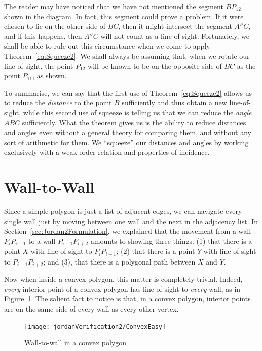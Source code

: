 The reader may have noticed that we have not mentioned the segment $BP_{12}$ shown in the diagram. In fact, this segment could prove a problem. If it were chosen to lie on the other side of $BC$, then it might intersect the segment $A''C$, and if this happens, then $A''C$ will not count as a line-of-sight. Fortunately, we shall be able to rule out this circumstance when we come to apply Theorem~\ref{eq:Squeeze2}. We shall always be assuming that, when we rotate our line-of-sight, the point $P_{12}$ will be known to be on the opposite side of $BC$ as the point $P_{11}$, as shown.

To summarise, we can say that the first use of Theorem~\ref{eq:Squeeze2} allows us to reduce the \emph{distance} to the point $B$ sufficiently and thus obtain a new line-of-sight, while this second use of squeeze is telling us that we can reduce the \emph{angle} $ABC$ sufficiently. What the theorem gives us is the ability to reduce distances and angles even without a general theory for comparing them, and without any sort of arithmetic for them. We ``squeeze'' our distances and angles by working exclusively with a weak order relation and properties of incidence.

\section{Wall-to-Wall}\label{sec:NavigationVerification}
Since a simple polygon is just a list of adjacent edges, we can navigate every single wall just by moving between one wall and the next in the adjacency list. In Section~\ref{sec:Jordan2Formulation}, we explained that the movement from a wall $P_{i}P_{i+1}$ to a wall $P_{i+1}P_{i+2}$ amounts to showing three things: (1) that there is a point $X$ with line-of-sight to $P_{i}P_{i+1}$; (2) that there is a point $Y$ with line-of-sight to $P_{i+1}P_{i+2}$; and (3), that there is a polygonal path between $X$ and $Y$.

Now when inside a convex polygon, this matter is completely trivial. Indeed, \emph{every} interior point of a convex polygon has line-of-sight to \emph{every} wall, as in Figure~\ref{fig:ConvexEasy}. The salient fact to notice is that, in a convex polygon, interior points are on the same side of every wall as every other vertex. 

\begin{figure}
\centering\texttt{[image: jordanVerification2/ConvexEasy]}
\caption{Wall-to-wall in a convex polygon}
\label{fig:ConvexEasy}
\end{figure}

